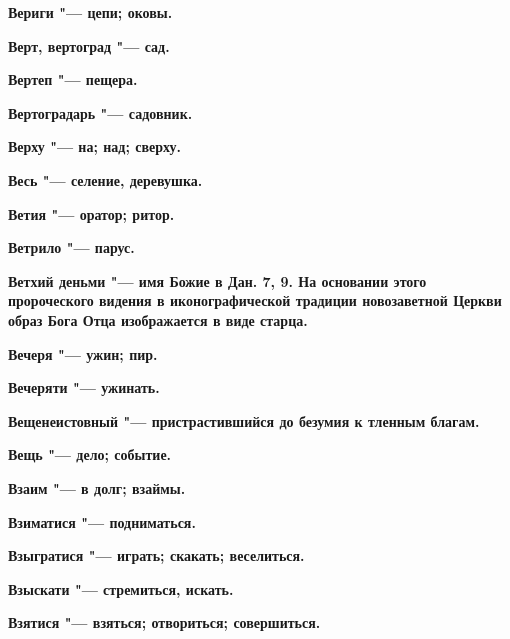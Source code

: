 \begin{mymulticols}{2}
\bfseries Вериги\normalfont{} "--- цепи; оковы. 




\bfseries Верт, вертоград\normalfont{} "--- сад. 




\bfseries Вертеп\normalfont{} "--- пещера. 




\bfseries Вертоградарь\normalfont{} "--- садовник. 




\bfseries Верху\normalfont{} "--- на; над; сверху. 




\bfseries Весь\normalfont{} "--- селение, деревушка. 




\bfseries Ветия\normalfont{} "--- оратор; ритор. 




\bfseries Ветрило\normalfont{} "--- парус. 




\bfseries Ветхий деньми\normalfont{} "--- имя Божие в Дан. 7, 9. На основании этого пророческого видения в иконографической традиции новозаветной Церкви образ Бога Отца изображается в виде старца. 




\bfseries Вечеря\normalfont{} "--- ужин; пир. 




\bfseries Вечеряти\normalfont{} "--- ужинать. 




\bfseries Вещенеистовный\normalfont{} "--- пристрастившийся до безумия к тленным благам. 




\bfseries Вещь\normalfont{} "--- дело; событие. 




\bfseries Взаим\normalfont{} "--- в долг; взаймы. 




\bfseries Взиматися\normalfont{} "--- подниматься. 




\bfseries Взыгратися\normalfont{} "--- играть; скакать; веселиться. 




\bfseries Взыскати\normalfont{} "--- стремиться, искать. 




\bfseries Взятися\normalfont{} "--- взяться; отвориться; совершиться. 





\end{mymulticols}
